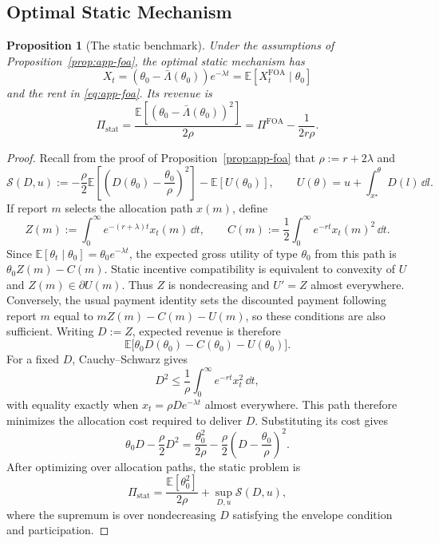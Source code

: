 \documentclass[12pt]{article}
\newtheorem{prop}{Proposition}
\newcommand{\E}{\mathbb{E}}
\begin{document}
\subsection{Optimal Static Mechanism}\label{app:static-benchmark}

\begin{prop}[The static benchmark]\label{prop:app-static}
Under the assumptions of Proposition~\ref{prop:app-foa}, the optimal
static mechanism has
\[
  X_t=(\theta_0-\bar\Lambda(\theta_0))e^{-\lambda t}
  =\E[X_t^{\mathrm{FOA}}\mid\theta_0]
\]
and the rent in \eqref{eq:app-foa}. Its revenue is
\[
  \Pi_{\mathrm{stat}}
  =\frac{\E[(\theta_0-\bar\Lambda(\theta_0))^2]}{2\rho}
  =\Pi^{\mathrm{FOA}}-\frac{1}{2r\rho}.
\]
\end{prop}

\begin{proof}
Recall from the proof of Proposition~\ref{prop:app-foa} that
\(\rho:=r+2\lambda\) and
\[
  \mathcal S(D,u)
  :=
  -\frac{\rho}{2}\E\left[
    \left(D(\theta_0)-\frac{\theta_0}{\rho}\right)^2
  \right]
  -\E[U(\theta_0)],
  \qquad
  U(\theta)=u+\int_{x^\star}^{\theta}D(l)\,\dd l.
\]
If report \(m\) selects the allocation path \(x(m)\), define
\[
  Z(m):=\int_0^\infty e^{-(r+\lambda)t}x_t(m)\,\dd t,
  \qquad
  C(m):=\frac12\int_0^\infty e^{-rt}x_t(m)^2\,\dd t.
\]
Since \(\E[\theta_t\mid\theta_0]=\theta_0e^{-\lambda t}\), the expected
gross utility of type \(\theta_0\) from this path is
\(\theta_0Z(m)-C(m)\). Static incentive compatibility is equivalent to
convexity of \(U\) and \(Z(m)\in\partial U(m)\). Thus \(Z\) is
nondecreasing and \(U'=Z\) almost everywhere. Conversely, the usual
payment identity sets the discounted payment following report \(m\) equal
to \(mZ(m)-C(m)-U(m)\), so these conditions are also sufficient.
Writing \(D:=Z\), expected revenue is therefore
\[
  \E\big[\theta_0D(\theta_0)-C(\theta_0)-U(\theta_0)\big].
\]
For a fixed \(D\), Cauchy--Schwarz gives
\[
  D^2
  \leq
  \frac1\rho\int_0^\infty e^{-rt}x_t^2\,\dd t,
\]
with equality exactly when
\(x_t=\rho De^{-\lambda t}\) almost everywhere. This path therefore
minimizes the allocation cost required to deliver \(D\). Substituting its
cost gives
\[
  \theta_0D-\frac{\rho}{2}D^2
  =
  \frac{\theta_0^2}{2\rho}
  -\frac{\rho}{2}
    \left(D-\frac{\theta_0}{\rho}\right)^2.
\]
After optimizing over allocation paths, the static problem is
\[
  \Pi_{\mathrm{stat}}
  =
  \frac{\E[\theta_0^2]}{2\rho}
  +\sup_{D,u}\mathcal S(D,u),
\]
where the supremum is over nondecreasing \(D\) satisfying the envelope
condition and participation.


\end{proof}
\end{document}
